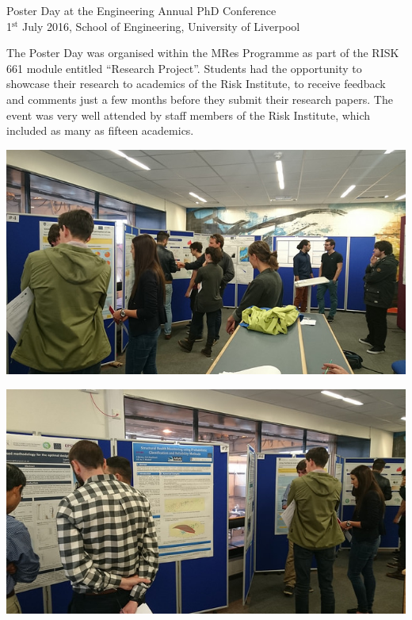 \documentclass[11pt]{article}%
\begin{document}
\begin{minipage}{1.\textwidth}
\vspace{20pt}
{\LARGE {Poster Day at the Engineering Annual PhD Conference}}\\
{\large 1$^{\text{st}}$ July 2016, School of Engineering, University of Liverpool}

The Poster Day was organised within the MRes Programme as part of the RISK 661 module entitled ``Research Project''. Students had the opportunity to showcase their research to academics of the Risk Institute, to receive feedback and comments just a few months before they submit their research papers. The event was very well attended by staff members of the Risk Institute, which included as many as fifteen academics.

\begin{multicols}{2}

\includegraphics[width=1\linewidth]{training/Picture8.jpg}


\includegraphics[width=1\linewidth]{training/Picture7.jpg}

\end{multicols}
\end{minipage}
\end{document}
